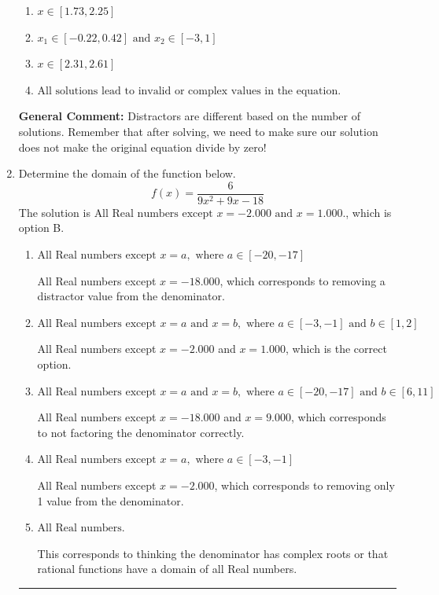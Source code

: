 \documentclass{extbook}[14pt]
\newcommand{\litem}[1]{\item #1

\rule{\textwidth}{0.4pt}}
\begin{document}
\begin{enumerate}
{\begin{enumerate}[label=\Alph*.]
* $x = -0.073 \text{ and } x = 2.036$, which is the correct option.
\item \( x \in [1.73,2.25] \)


\item \( x_1 \in [-0.22, 0.42] \text{ and } x_2 \in [-3,1] \)


\item \( x \in [2.31,2.61] \)


\item \( \text{All solutions lead to invalid or complex values in the equation.} \)


\end{enumerate}

\textbf{General Comment:} Distractors are different based on the number of solutions. Remember that after solving, we need to make sure our solution does not make the original equation divide by zero!
}
\litem{
Determine the domain of the function below.
\[ f(x) = \frac{6}{9x^{2} +9 x -18} \]The solution is \( \text{All Real numbers except } x = -2.000 \text{ and } x = 1.000. \), which is option B.\begin{enumerate}[label=\Alph*.]
\item \( \text{All Real numbers except } x = a, \text{ where } a \in [-20, -17] \)

All Real numbers except $x = -18.000$, which corresponds to removing a distractor value from the denominator.
\item \( \text{All Real numbers except } x = a \text{ and } x = b, \text{ where } a \in [-3, -1] \text{ and } b \in [1, 2] \)

All Real numbers except $x = -2.000$ and $x = 1.000$, which is the correct option.
\item \( \text{All Real numbers except } x = a \text{ and } x = b, \text{ where } a \in [-20, -17] \text{ and } b \in [6, 11] \)

All Real numbers except $x = -18.000$ and $x = 9.000$, which corresponds to not factoring the denominator correctly.
\item \( \text{All Real numbers except } x = a, \text{ where } a \in [-3, -1] \)

All Real numbers except $x = -2.000$, which corresponds to removing only 1 value from the denominator.
\item \( \text{All Real numbers.} \)

This corresponds to thinking the denominator has complex roots or that rational functions have a domain of all Real numbers.
\end{enumerate}

}
\end{enumerate}
\end{document}
